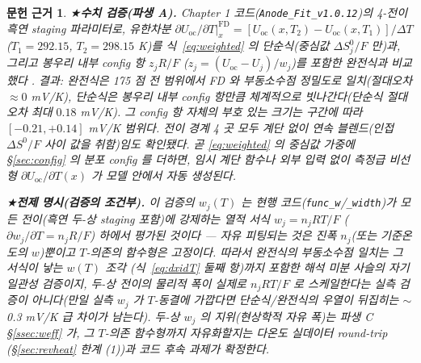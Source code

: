\documentclass[11pt,a4paper]{article}
\newtheorem*{srcbox}{문헌 근거}
\newcommand{\oc}{\mathrm{oc}}
\begin{document}
\begin{srcbox}
★\textbf{수치 검증(파생 A).} Chapter 1 코드(\texttt{Anode\_Fit\_v1.0.12})의 4-전이 흑연 staging 파라미터로,
유한차분 $\partial U_\oc/\partial T|_x^\mathrm{FD}=[U_\oc(x,T_2)-U_\oc(x,T_1)]/\Delta T$ ($T_1{=}292.15$,
$T_2{=}298.15$ K)를 식~\eqref{eq:weighted} 의 \emph{단순식}(중심값 $\Delta S^0_j/F$ 만)과, 그리고 봉우리 내부
config 항 $z_j R/F$ ($z_j=(U_\oc-U_j)/w_j$)를 포함한 \emph{완전식}과 비교했다 \cite{numverif2026}. 결과:
완전식은 175 점 전 범위에서 FD 와 \emph{부동소수점 정밀도}로 일치(절대오차 $\approx0$ mV/K), 단순식은 봉우리
내부 config 항만큼 체계적으로 빗나간다(단순식 절대오차 최대 $0.18$ mV/K). 그 config 항 자체의 부호 있는 크기는
구간에 따라 $[-0.21,+0.14]$ mV/K 범위다. 전이 경계 4 곳 모두 \emph{계단 없이} 연속 블렌드(인접 $\Delta S^0/F$
사이 값을 취함)임도 확인됐다. 곧 \eqref{eq:weighted} 의 중심값 가중에 \S\ref{sec:config} 의
분포 config 를 더하면, 임시 계단 함수나 외부 입력 없이 \emph{측정급 비선형} $\partial U_\oc/\partial T(x)$ 가
모델 안에서 자동 생성된다.

★\textbf{전제 명시(검증의 조건부).} 이 검증의 $w_j(T)$ 는 현행 코드(\texttt{func\_w}/\texttt{\_width})가
\emph{모든} 전이(흑연 두-상 staging 포함)에 강제하는 열적 서식 $w_j=n_jRT/F$
($\partial w_j/\partial T=n_jR/F$) 하에서 평가된 것이다 — 자유 피팅되는 것은 진폭 $n_j$(또는 기준온도의
$w$)뿐이고 $T$-의존의 함수형은 고정이다. 따라서 완전식의 부동소수점 일치는 그 서식이 낳는 $w(T)$ 조각
(식~\eqref{eq:dxidT} 둘째 항)까지 포함한 \emph{해석 미분 사슬의 자기일관성} 검증이지, 두-상 전이의
물리적 폭이 실제로 $n_jRT/F$ 로 스케일한다는 \emph{실측 검증이 아니다}(만일 실측 $w_j$ 가 $T$-동결에
가깝다면 단순식/완전식의 우열이 뒤집히는 $\sim$0.3 mV/K 급 차이가 남는다). 두-상 $w_j$ 의 지위(현상학적
자유 폭)는 파생 C \S\ref{ssec:weff} 가, 그 $T$-의존 함수형까지 자유화할지는 다온도 실데이터 round-trip
(\S\ref{sec:revheat} 한계 (1))과 코드 후속 과제가 확정한다.
\end{srcbox}
\end{document}
